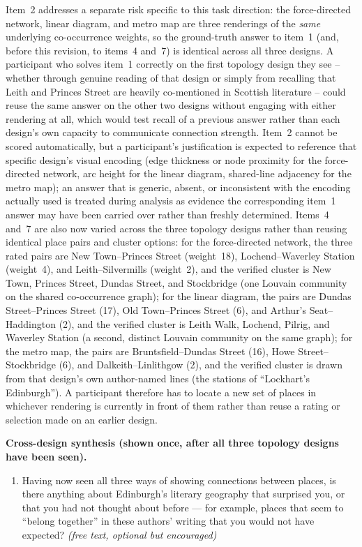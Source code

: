 \documentclass[logo,msc]{infthesis}
\begin{document}
Item~2 addresses a separate risk specific to this task direction: the force-directed network, linear diagram, and metro map are three renderings of the \emph{same} underlying co-occurrence weights, so the ground-truth answer to item~1 (and, before this revision, to items~4 and~7) is identical across all three designs. A participant who solves item~1 correctly on the first topology design they see -- whether through genuine reading of that design or simply from recalling that Leith and Princes Street are heavily co-mentioned in Scottish literature -- could reuse the same answer on the other two designs without engaging with either rendering at all, which would test recall of a previous answer rather than each design's own capacity to communicate connection strength. Item~2 cannot be scored automatically, but a participant's justification is expected to reference that specific design's visual encoding (edge thickness or node proximity for the force-directed network, arc height for the linear diagram, shared-line adjacency for the metro map); an answer that is generic, absent, or inconsistent with the encoding actually used is treated during analysis as evidence the corresponding item~1 answer may have been carried over rather than freshly determined. Items~4 and~7 are also now varied across the three topology designs rather than reusing identical place pairs and cluster options: for the force-directed network, the three rated pairs are New Town--Princes Street (weight~18), Lochend--Waverley Station (weight~4), and Leith--Silvermills (weight~2), and the verified cluster is New Town, Princes Street, Dundas Street, and Stockbridge (one Louvain community on the shared co-occurrence graph); for the linear diagram, the pairs are Dundas Street--Princes Street (17), Old Town--Princes Street (6), and Arthur's Seat--Haddington (2), and the verified cluster is Leith Walk, Lochend, Pilrig, and Waverley Station (a second, distinct Louvain community on the same graph); for the metro map, the pairs are Bruntsfield--Dundas Street (16), Howe Street--Stockbridge (6), and Dalkeith--Linlithgow (2), and the verified cluster is drawn from that design's own author-named lines (the stations of ``Lockhart's Edinburgh''). A participant therefore has to locate a new set of places in whichever rendering is currently in front of them rather than reuse a rating or selection made on an earlier design.

\textbf{Cross-design synthesis (shown once, after all three topology designs have been seen).}
\begin{enumerate}
  \item Having now seen all three ways of showing connections between places, is there anything about Edinburgh's literary geography that surprised you, or that you had not thought about before --- for example, places that seem to ``belong together'' in these authors' writing that you would not have expected? \emph{(free text, optional but encouraged)}
\end{enumerate}
\end{document}
